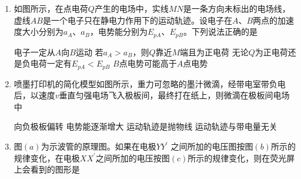 \begin{enumerate}[leftmargin=0em]
\item
{}
如图所示，在点电荷$ Q $产生的电场中，实线$ MN $是一条方向未标出的电场线，虚线$ AB $是一个电子只在静电力作用下的运动轨迹。设电子在$ A $、$ B $两点的加速度大小分别为$ a_A $、$ a_B $，电势能分别为$ E_{pA} $、$ E_{pB} $。下列说法正确的是  


\begin{minipage}[h!]{0.7\linewidth}
\vspace{0.3em}
\fourchoices
{电子一定从$ A $向$ B $运动}
{若$ a_A>a_B $，则$ Q $靠近$ M $端且为正电荷}
{无论$ Q $为正电荷还是负电荷一定有$ E_{pA}<E_{pB} $}
{$ B $点电势可能高于$ A $点电势}
\vspace{0.3em}
\end{minipage}
\hfill
\begin{minipage}[h!]{0.3\linewidth}
\flushright
\vspace{0.3em}

\vspace{0.3em}
\end{minipage}




\item
{}
喷墨打印机的简化模型如图所示，重力可忽略的墨汁微滴，经带电室带负电后，以速度$ v $垂直匀强电场飞入极板间，最终打在纸上，则微滴在极板间电场中  
\begin{figure}[h!]
\centering

\end{figure}



\fourchoices
{向负极板偏转}
{电势能逐渐增大}
{运动轨迹是抛物线}
{运动轨迹与带电量无关}





\item
{}
图$ (a) $为示波管的原理图。如果在电极$ YY ^{\prime} $ 之间所加的电压图按图$ (b) $所示的规律变化，在电极$ XX ^{\prime} $之间所加的电压按图$ (c) $所示的规律变化，则在荧光屏上会看到的图形是  
\begin{figure}[h!]
\centering
\\

\end{figure}




\end{enumerate}
